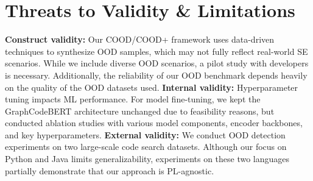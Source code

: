 \section{Threats to Validity \& Limitations}\label{sec:threats}
\noindent\textbf{Construct validity:} Our COOD/COOD+ framework uses data-driven techniques to synthesize OOD samples, which may not fully reflect real-world SE scenarios. While we include diverse OOD scenarios, a pilot study with developers is necessary. Additionally, the reliability of our OOD benchmark depends heavily on the quality of the OOD datasets used. \textbf{Internal validity:} Hyperparameter tuning impacts ML performance. For model fine-tuning, we kept the GraphCodeBERT architecture unchanged due to feasibility reasons, but conducted ablation studies with various model components, encoder backbones, and key hyperparameters. \textbf{External validity:} We conduct OOD detection experiments on two large-scale code search datasets. Although our focus on Python and Java limits generalizability, experiments on these two languages partially demonstrate that our approach is PL-agnostic.

